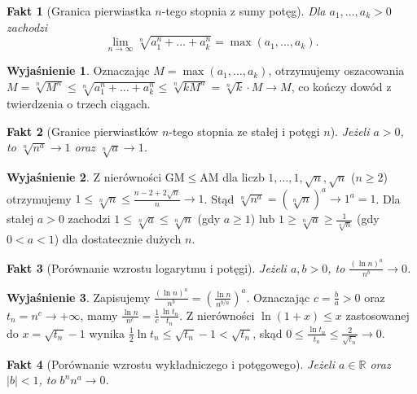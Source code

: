 \documentclass[11pt, a4paper]{article}
\theoremstyle{plain}
\newtheorem{fakt}{Fakt}
\theoremstyle{definition}
\newtheorem*{wyjasnienie}{Wyjaśnienie}
\begin{document}
\begin{fakt}[Granica pierwiastka $n$-tego stopnia z sumy potęg]
Dla $a_1, \dots, a_k > 0$ zachodzi
\[
\lim_{n\to\infty} \sqrt[n]{a_1^n + \dots + a_k^n} = \max(a_1, \dots, a_k).
\]
\end{fakt}

\begin{wyjasnienie}
Oznaczając $M = \max(a_1, \dots, a_k)$, otrzymujemy oszacowania $M = \sqrt[n]{M^n} \leqslant \sqrt[n]{a_1^n + \dots + a_k^n} \leqslant \sqrt[n]{k M^n} = \sqrt[n]{k} \cdot M \to M$, co kończy dowód z twierdzenia o trzech ciągach.
\end{wyjasnienie}

\begin{fakt}[Granice pierwiastków $n$-tego stopnia ze stałej i potęgi $n$]
Jeżeli $a > 0$, to $\sqrt[n]{n^a} \to 1$ oraz $\sqrt[n]{a} \to 1$.
\end{fakt}

\begin{wyjasnienie}
Z nierówności $\mathrm{GM} \leqslant \mathrm{AM}$ dla liczb $1, \dots, 1, \sqrt{n}, \sqrt{n}$ ($n \geqslant 2$) otrzymujemy $1 \leqslant \sqrt[n]{n} \leqslant \frac{n - 2 + 2\sqrt{n}}{n} \to 1$. Stąd $\sqrt[n]{n^a} = (\sqrt[n]{n})^a \to 1^a = 1$. Dla stałej $a > 0$ zachodzi $1 \leqslant \sqrt[n]{a} \leqslant \sqrt[n]{n}$ (gdy $a \geqslant 1$) lub $1 \geqslant \sqrt[n]{a} \geqslant \frac{1}{\sqrt[n]{n}}$ (gdy $0 < a < 1$) dla dostatecznie dużych $n$.
\end{wyjasnienie}

\begin{fakt}[Porównanie wzrostu logarytmu i potęgi]
Jeżeli $a, b > 0$, to $\frac{(\ln n)^a}{n^b} \to 0$.
\end{fakt}

\begin{wyjasnienie}
Zapisujemy $\frac{(\ln n)^a}{n^b} = \left(\frac{\ln n}{n^{b/a}}\right)^a$. Oznaczając $c = \frac{b}{a} > 0$ oraz $t_n = n^c \to +\infty$, mamy $\frac{\ln n}{n^c} = \frac{1}{c}\frac{\ln t_n}{t_n}$. Z nierówności $\ln(1 + x) \leqslant x$ zastosowanej do $x = \sqrt{t_n} - 1$ wynika $\frac{1}{2}\ln t_n \leqslant \sqrt{t_n} - 1 < \sqrt{t_n}$, skąd $0 \leqslant \frac{\ln t_n}{t_n} \leqslant \frac{2}{\sqrt{t_n}} \to 0$.
\end{wyjasnienie}

\begin{fakt}[Porównanie wzrostu wykładniczego i potęgowego]
Jeżeli $a \in \mathbb{R}$ oraz $\lvert b \rvert < 1$, to $b^n n^a \to 0$.
\end{fakt}
\end{document}
